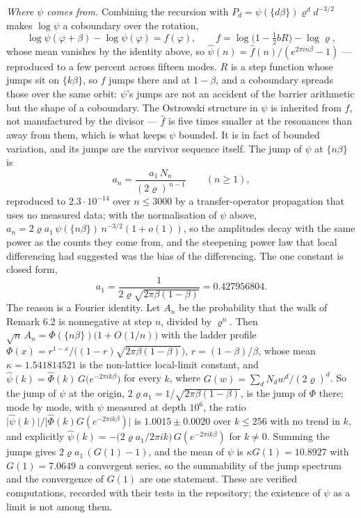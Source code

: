 \documentclass[11pt,a4paper]{article}
\begin{document}
\emph{Where \(\psi\) comes from.} Combining the recursion with
\(P_d=\psi(\{d\beta\})\varrho^{d}d^{-3/2}\) makes \(\log\psi\) a
coboundary over the rotation, \[
\log\psi(\varphi+\beta)-\log\psi(\varphi)=f(\varphi),\qquad
f=\log\bigl(1-\tfrac12 b R\bigr)-\log\varrho,
\] whose mean vanishes by the identity above, so
\(\hat\psi(n)=\hat f(n)/(e^{2\pi in\beta}-1)\) --- reproduced to a few
percent across fifteen modes. \(R\) is a step function whose jumps sit
on \(\{k\beta\}\), so \(f\) jumps there and at \(1-\beta\), and a
coboundary spreads those over the same orbit: \(\psi\)'s jumps are not
an accident of the barrier arithmetic but the shape of a coboundary. The
Ostrowski structure in \(\hat\psi\) is inherited from \(\hat f\), not
manufactured by the divisor --- \(\hat f\) is five times smaller at the
resonances than away from them, which is what keeps \(\psi\) bounded. It
is in fact of bounded variation, and its jumps are the survivor sequence
itself. The jump of \(\psi\) at \(\{n\beta\}\) is \[
a_n=\frac{a_1\,N_n}{(2\varrho)^{\,n-1}}\qquad(n\ge1),
\] reproduced to \(2.3\cdot10^{-14}\) over \(n\le3000\) by a
transfer-operator propagation that uses no measured data; with the
normalisation of \(\psi\) above,
\(a_n=2\varrho a_1\,\psi(\{n\beta\})\,n^{-3/2}(1+o(1))\), so the
amplitudes decay with the same power as the counts they come from, and
the steepening power law that local differencing had suggested was the
bias of the differencing. The one constant is closed form, \[
a_1=\frac{1}{2\varrho\sqrt{2\pi\beta(1-\beta)}}=0.427956804.
\] The reason is a Fourier identity. Let \(A_n\) be the probability that
the walk of Remark 6.2 is nonnegative at step \(n\), divided by
\(\varrho^{n}\). Then
\(\sqrt n\,A_n=\Phi(\{n\beta\})\bigl(1+O(1/n)\bigr)\) with the ladder
profile
\(\Phi(x)=r^{1-x}\big/\bigl((1-r)\sqrt{2\pi\beta(1-\beta)}\bigr)\),
\(r=(1-\beta)/\beta\), whose mean \(\kappa=1.541814521\) is the
non-lattice local-limit constant, and
\(\hat\psi(k)=\hat\Phi(k)\,G\bigl(e^{-2\pi ik\beta}\bigr)\) for every
\(k\), where \(G(w)=\sum_dN_dw^d/(2\varrho)^d\). So the jump of \(\psi\)
at the origin, \(2\varrho a_1=1/\sqrt{2\pi\beta(1-\beta)}\), is the jump
of \(\Phi\) there; mode by mode, with \(\psi\) measured at depth
\(10^6\), the ratio
\(\lvert\hat\psi(k)\rvert/\lvert\hat\Phi(k)G(e^{-2\pi ik\beta})\rvert\)
is \(1.0015\pm0.0020\) over \(k\le256\) with no trend in \(k\), and
explicitly
\(\hat\psi(k)=-\bigl(2\varrho a_1/2\pi ik\bigr)\,G(e^{-2\pi ik\beta})\)
for \(k\ne0\). Summing the jumps gives \(2\varrho a_1\,(G(1)-1)\), and
the mean of \(\psi\) is \(\kappa G(1)=10.8927\) with \(G(1)=7.0649\) a
convergent series, so the summability of the jump spectrum and the
convergence of \(G(1)\) are one statement. These are verified
computations, recorded with their tests in the repository; the existence
of \(\psi\) as a limit is not among them.
\end{document}
